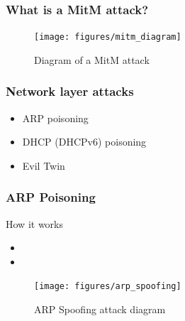\documentclass{beamer}
\begin{document}
\begin{frame}
  \frametitle{What is a MitM attack?}
  \begin{figure}
  \texttt{[image: figures/mitm\_diagram]}
  \caption*{Diagram of a MitM attack}
  \end{figure}

\end{frame}


\begin{frame}
  \frametitle{Network layer attacks}
  \begin{block}{}
    \begin{itemize}
      \item ARP poisoning
      \item DHCP (DHCPv6) poisoning
      \item Evil Twin
    \end{itemize}
  \end{block}

\end{frame}

\begin{frame}
  \frametitle{ARP Poisoning}
  \begin{block}{How it works}
  \begin{itemize}
    \item
    \item
  \end{itemize}
\end{block}
  \begin{figure}
    \texttt{[image: figures/arp\_spoofing]}
    \caption*{ARP Spoofing attack diagram}
  \end{figure}
\end{frame}
\end{document}
